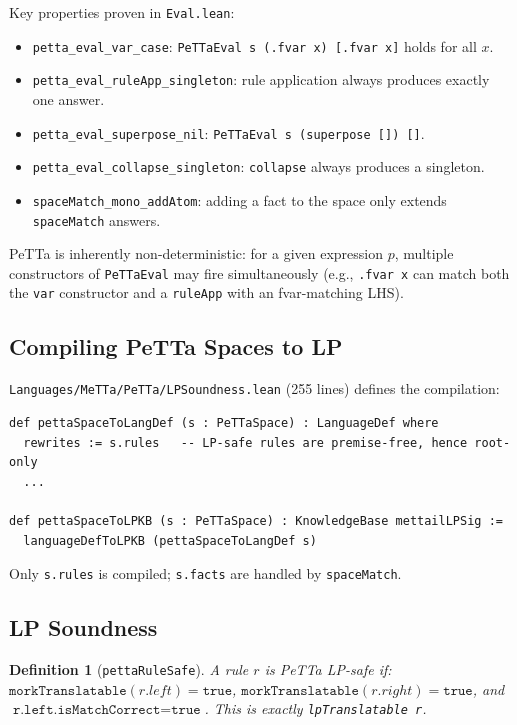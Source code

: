 \documentclass[]{article}
\newtheorem{definition}[theorem]{Definition}
\newcommand{\code}[1]{\texttt{#1}}
\newcommand{\PeTTa}{\textup{PeTTa}}
\begin{document}
Key properties proven in \code{Eval.lean}:
\begin{itemize}
\item \code{petta\_eval\_var\_case}: \code{PeTTaEval s (.fvar x) [.fvar x]} holds for all $x$.
\item \code{petta\_eval\_ruleApp\_singleton}: rule application always produces exactly one answer.
\item \code{petta\_eval\_superpose\_nil}: \code{PeTTaEval s (superpose []) []}.
\item \code{petta\_eval\_collapse\_singleton}: \code{collapse} always produces a singleton.
\item \code{spaceMatch\_mono\_addAtom}: adding a fact to the space only extends \code{spaceMatch} answers.
\end{itemize}

\PeTTa{} is inherently non-deterministic: for a given expression $p$, multiple
constructors of \code{PeTTaEval} may fire simultaneously (e.g., \code{.fvar x}
can match both the \code{var} constructor and a \code{ruleApp} with an
fvar-matching LHS).

\subsection{Compiling \PeTTa{} Spaces to LP}

\code{Languages/MeTTa/PeTTa/LPSoundness.lean} (255 lines) defines the compilation:

\begin{lstlisting}[language=lean]
def pettaSpaceToLangDef (s : PeTTaSpace) : LanguageDef where
  rewrites := s.rules   -- LP-safe rules are premise-free, hence root-only
  ...

def pettaSpaceToLPKB (s : PeTTaSpace) : KnowledgeBase mettailLPSig :=
  languageDefToLPKB (pettaSpaceToLangDef s)
\end{lstlisting}

Only \code{s.rules} is compiled; \code{s.facts} are handled by \code{spaceMatch}.

\subsection{LP Soundness}

\begin{definition}[\code{pettaRuleSafe}]
A rule $r$ is \emph{PeTTa LP-safe} if:
$\code{morkTranslatable}(r.left) = \code{true}$,
$\code{morkTranslatable}(r.right) = \code{true}$, and
$\code{r.left.isMatchCorrect} = \code{true}$.
This is exactly \code{lpTranslatable r}.
\end{definition}
\end{document}
